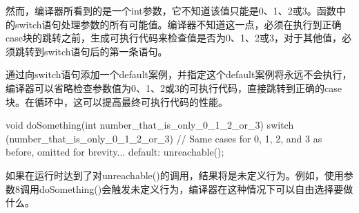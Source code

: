 然而，编译器所看到的是一个int参数，它不知道该值只能是0、1、2或3。函数中的switch语句处理参数的所有可能值。编译器不知道这一点，必须在执行到正确case块的跳转之前，生成可执行代码来检查值是否为0、1、2或3，对于其他值，必须跳转到switch语句后的第一条语句。

通过向switch语句添加一个default案例，并指定这个default案例将永远不会执行，编译器可以省略检查参数值为0、1、2或3的可执行代码，直接跳转到正确的case块。在循环中，这可以提高最终可执行代码的性能。

\begin{cpp}
void doSomething(int number_that_is_only_0_1_2_or_3)
{
    switch (number_that_is_only_0_1_2_or_3) {
        // Same cases for 0, 1, 2, and 3 as before, omitted for brevity...
        default:
            unreachable();
    }
}
\end{cpp}

如果在运行时达到了对unreachable()的调用，结果将是未定义行为。例如，使用参数8调用doSomething()会触发未定义行为，编译器在这种情况下可以自由选择要做什么。











